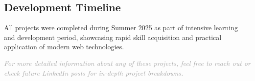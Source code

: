 \documentclass[11pt,a4paper]{article}
\begin{document}
\subsection{Development Timeline}
All projects were completed during Summer 2025 as part of intensive learning and development period, showcasing rapid skill acquisition and practical application of modern web technologies.

\vspace{2cm}

\begin{center}
\textcolor{darkgray}{\textit{For more detailed information about any of these projects, feel free to reach out or check future LinkedIn posts for in-depth project breakdowns.}}
\end{center}
\end{document}
